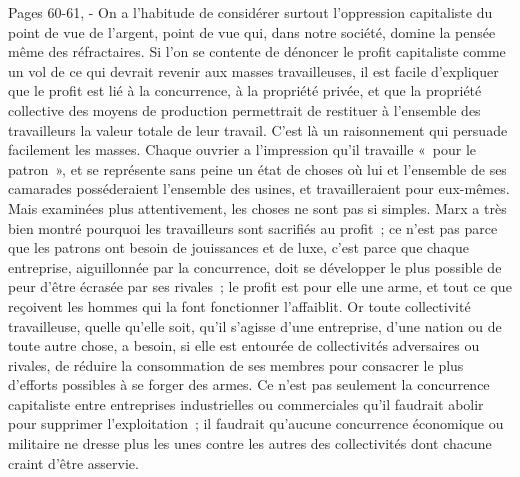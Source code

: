 \documentclass[french,twoside]{book} %
\begin{document}
Pages 60-61, - On a l'habitude de considérer surtout l'oppression capitaliste du point de vue de l'argent, point de vue qui, dans notre société, domine la pensée même des réfractaires. Si l'on se contente de dénoncer le profit capitaliste comme un vol de ce qui devrait revenir aux masses travailleuses, il est facile d'expliquer que le profit est lié à la concurrence, à la propriété privée, et que la propriété collective des moyens de production permettrait de restituer à l'ensemble des travailleurs la valeur totale de leur travail. C'est là un raisonnement qui persuade facilement les masses. Chaque ouvrier a l'impression qu'il travaille « pour le patron », et se représente sans peine un état de choses où lui et l'ensemble de ses camarades posséderaient l'ensemble des usines, et travailleraient pour eux-mêmes. Mais examinées plus attentivement, les choses ne sont pas si simples. Marx a très bien montré pourquoi les travailleurs sont sacrifiés au profit ; ce n'est pas parce que les patrons ont besoin de jouissances et de luxe, c'est parce que chaque entreprise, aiguillonnée par la concurrence, doit se développer le plus possible de peur d'être écrasée par ses rivales ; le profit est pour elle une arme, et tout ce que reçoivent les hommes qui la font fonctionner l'affaiblit. Or toute collectivité travailleuse, quelle qu'elle soit, qu'il s'agisse d'une entreprise, d'une nation ou de toute autre chose, a besoin, si elle est entourée de collectivités adversaires ou rivales, de réduire la consommation de ses membres pour consacrer le plus d'efforts possibles à se forger des armes. Ce n'est pas seulement la concurrence capitaliste entre entreprises industrielles ou commerciales qu'il faudrait abolir pour supprimer l'exploitation ; il faudrait qu'aucune concurrence économique ou militaire ne dresse plus les unes contre les autres des collectivités dont chacune craint d'être asservie.\par
\end{document}
